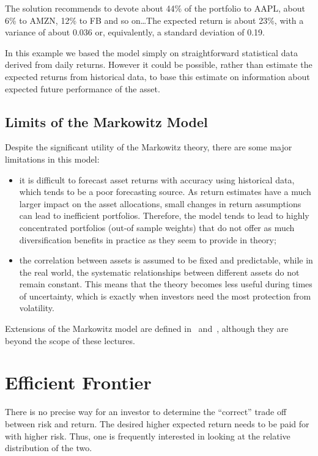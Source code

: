 The solution recommends to devote about 44\% of the portfolio to AAPL, about 6\% to AMZN, 12\% to FB and so on\ldots The expected return is about 23\%, with a variance of about 0.036 or, equivalently, a standard deviation of 0.19.

In this example we based the model simply on straightforward statistical data derived from daily returns. However it could be possible, rather than estimate the expected returns from historical data, to base this estimate on information about expected future performance of the asset.


\subsection{Limits of the Markowitz Model}
\label{limits-of-the-markowitz-model}

Despite the significant utility of the Markowitz theory, there are some major limitations in this model:

\begin{itemize}
	\tightlist
	\item
	it is difficult to forecast asset returns with accuracy using
	historical data, which tends to be a poor forecasting source. As
	return estimates have a much larger impact on the asset allocations,
	small changes in return assumptions can lead to inefficient
	portfolios. Therefore, the model tends to lead to highly concentrated
	portfolios (out-of sample weights) that do not offer as much
	diversification benefits in practice as they seem to provide in
	theory;
	\item
	the correlation between assets is assumed to be fixed and predictable, while
	in the real world, the systematic relationships between different assets 
	do not remain constant. This means that the theory becomes less useful during 
	times of uncertainty, which is exactly when investors need the most protection 
	from volatility.
\end{itemize}

Extensions of the Markowitz model are defined in~\cite{bib:post_modern_theory} and~\cite{bib:black_litterman}, although they are beyond the scope of these lectures. 

\section{Efficient Frontier}
\label{efficient-frontier}
There is no precise way for an investor to determine the “correct” trade off between risk and return. The desired higher expected return needs to be paid for with higher risk. Thus, one is frequently interested in looking at the relative distribution of the two.

